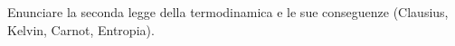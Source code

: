 \question  Enunciare la seconda legge della termodinamica e le sue conseguenze (Clausius, Kelvin, Carnot, Entropia).
